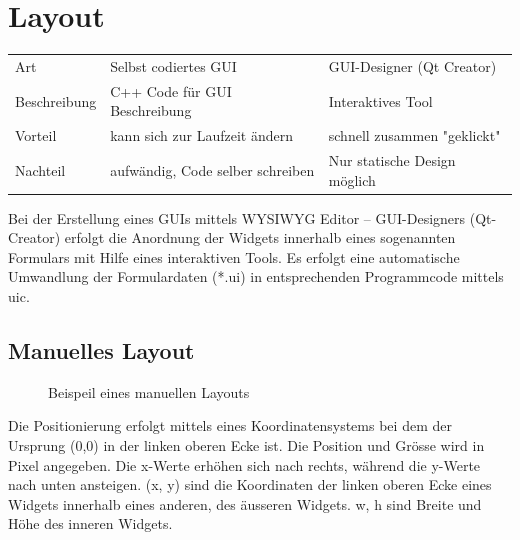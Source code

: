 \section{Layout}

\begin{tabular}{|l|l|l|}
	Art & Selbst codiertes GUI & GUI-Designer (Qt Creator) \\
	Beschreibung & C++ Code für GUI Beschreibung & Interaktives Tool \\
	Vorteil & kann sich zur Laufzeit ändern & schnell zusammen "geklickt" \\
	Nachteil & aufwändig, Code selber schreiben & Nur statische Design möglich
\end{tabular}

Bei der Erstellung eines GUIs mittels WYSIWYG Editor – GUI-Designers (Qt-Creator) erfolgt die Anordnung der Widgets innerhalb eines sogenannten Formulars mit Hilfe eines interaktiven Tools. Es erfolgt eine automatische Umwandlung der Formulardaten (*.ui) in entsprechenden Programmcode mittels uic. 

\subsection{Manuelles Layout}

\begin{figure}[ht]
	\centering
	\caption[]{Beispeil eines manuellen Layouts}
\end{figure}

Die Positionierung erfolgt mittels eines Koordinatensystems bei dem der Ursprung (0,0) in der linken oberen Ecke ist. Die Position und Grösse wird in Pixel angegeben. Die x-Werte erhöhen sich nach rechts, während die y-Werte nach unten ansteigen. (x, y) sind die Koordinaten der linken oberen Ecke eines Widgets innerhalb eines anderen, des äusseren Widgets. w, h sind Breite und Höhe des inneren Widgets.

